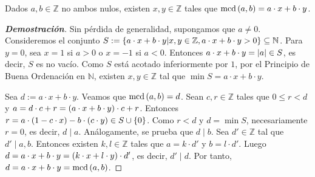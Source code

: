 \begin{theorem}\label{Identidad de Bézout}
  \rm Dados $a,b\in\mathbb{Z}$ no ambos nulos, existen $x,y\in\mathbb{Z}$ tales que $\text{mcd}\left(a,b\right)=a\cdot x+b\cdot y$.
  \begin{proof}[\rm\textbf{Demostración}]
    Sin pérdida de generalidad, supongamos que $a\neq 0$. Consideremos el conjunto $S:=\left\{a\cdot x+b\cdot y\middle|x,y\in\mathbb{Z},a\cdot x+b\cdot y>0\right\}\subseteq\mathbb{N}$. Para $y=0$, sea $x=1$ si $a>0$ o $x=-1$ si $a<0$. Entonces $a\cdot x+b\cdot y=\left|a\right|\in S$, es decir, $S$ es no vacío. Como $S$ está acotado inferiormente por $1$, por el Principio de Buena Ordenación en $\mathbb{N}$, existen $x,y\in\mathbb{Z}$ tal que $\min S=a\cdot x+b\cdot y$. 
    
    Sea $d:=a\cdot x+b\cdot y$. Veamos que $\text{mcd}\left(a,b\right)=d$. Sean $c,r\in\mathbb{Z}$ tales que $0\leq r<d$ y $a=d\cdot c+r=\left(a\cdot x+b\cdot y\right)\cdot c+r$. Entonces $r=a\cdot\left(1-c\cdot x\right)-b\cdot\left(c\cdot y\right)\in S\cup\left\{0\right\}$. Como $r<d$ y $d=\min S$, necesariamente $r=0$, es decir, $d\mid a$. Análogamente, se prueba que $d\mid b$. Sea $d'\in\mathbb{Z}$ tal que $d'\mid a,b$. Entonces existen $k,l\in\mathbb{Z}$ tales que $a=k\cdot d'$ y $b=l\cdot d'$. Luego $d=a\cdot x+b\cdot y=\left(k\cdot x+l\cdot y\right)\cdot d'$, es decir, $d'\mid d$. Por tanto, $d=a\cdot x+b\cdot y=\text{mcd}\left(a,b\right)$.
  \end{proof}
\end{theorem}

